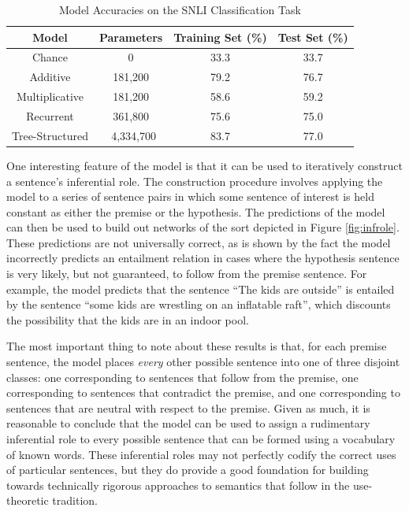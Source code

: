 \begin{table}[!t]
\begin{center} 
\caption{Model Accuracies on the SNLI Classification Task} 
\label{accuracy} 
\vskip 0.12in
\begin{tabular}{c c c c} 
\hline
Model & Parameters &  Training Set (\%)  & Test Set (\%)\\
\hline
Chance  & 0 & 33.3 &  33.7 \\
Additive & 181,200 & 79.2 & 76.7 \\ 
Multiplicative & 181,200 & 58.6 & 59.2 \\
Recurrent & 361,800 &  75.6 & 75.0  \\
Tree-Structured &  4,334,700 &  83.7 & 77.0  \\
\hline
\end{tabular} 
\end{center} 
\end{table}

One interesting feature of the model is that it can be used to iteratively construct a sentence's inferential role. The construction procedure involves applying the model to a series of sentence pairs in which some sentence of interest is held constant as either the premise or the hypothesis. The predictions of the model can then be used to build out networks of the sort depicted in Figure \ref{fig:infrole}. These predictions are not universally correct, as is shown by the fact the model incorrectly predicts an entailment relation in cases where the hypothesis sentence is very likely, but not guaranteed, to follow from the premise sentence. For example, the model predicts that the sentence ``The kids are outside'' is entailed by the sentence ``some kids are wrestling on an inflatable raft'', which discounts the possibility that the kids are in an indoor pool.

The most important thing to note about these results is that, for each premise sentence, the model places \textit{every} other possible sentence into one of three disjoint classes: one corresponding to sentences that follow from the premise, one corresponding to sentences that contradict the premise, and one corresponding to sentences that are neutral with respect to the premise. Given as much, it is reasonable to conclude that the model can be used to assign a rudimentary inferential role to every possible sentence that can be formed using a vocabulary of known words. These inferential roles may not perfectly codify the correct uses of particular sentences, but they do provide a good foundation for building towards technically rigorous approaches to semantics that follow in the use-theoretic tradition.  


